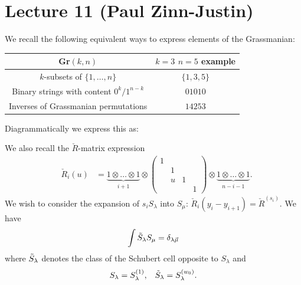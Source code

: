 \documentclass[12pt]{amsart}
\numberwithin{equation}{section}
\theoremstyle{definition}
\numberwithin{figure}{section}
\begin{document}
\section{Lecture 11 (Paul Zinn-Justin)}
We recall the following equivalent ways to express elements of the Grassmanian:
\begin{center}
	\begin{tabular}{ |c |c| }
		\hline
		Gr$(k,n)$ & $k=3$ $n=5$ example \\ \hline
		$k$-subsets of $\lbrace 1,\dots,n\rbrace$ & $\lbrace 1,3,5\rbrace$ \\ 
		Binary strings with content $0^k/1^{n-k}$ & $01010$ \\  
		Inverses of Grassmanian permutations & $14253$ \\
		\hline 
	\end{tabular}
\end{center}
Diagrammatically we express this as:
\begin{center}
\end{center}
We also recall the $\check{R}$-matrix expression
\begin{align*}
	&&\check{R}_i(u)&=\underbrace{1\otimes\dots\otimes 1}_\text{$i+1$}\otimes \left(\begin{array}{cccc}
		1 &  & &  \\
		&  1 & & \\
		& u& 1 & \\
		& & & 1
	\end{array} \right)\otimes\underbrace{1\otimes\dots\otimes 1}_\text{$n-i-1$}.&
\end{align*}
We wish to consider the expansion of $s_iS_\lambda$ into $S_\mu$: $\check{R}_i(y_i-y_{i+1})=\check{R}^{(s_i)}$. We have
\begin{align*}
	&&\int \Tilde{S}_\lambda S_\mu&=\delta_{\lambda\vec{\mu}}&
\end{align*}
where $\Tilde{S}_\lambda$ denotes the class of the Schubert cell opposite to $S_\lambda$ and
\begin{align*}
	&& S_\lambda&=S_\lambda^{(1)}, & \Tilde{S}_\lambda&=S^{(w_0)}_\lambda.&
\end{align*}
\end{document}
